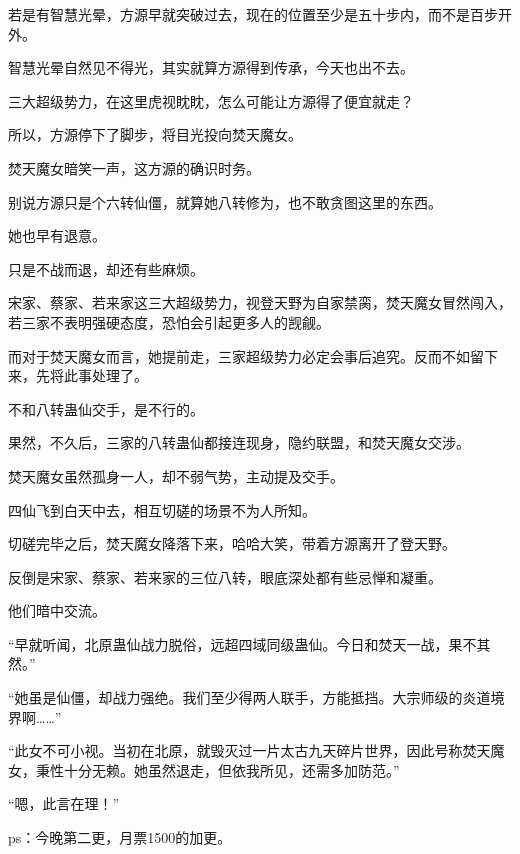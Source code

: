 \begin{this_body}
若是有智慧光晕，方源早就突破过去，现在的位置至少是五十步内，而不是百步开外。

智慧光晕自然见不得光，其实就算方源得到传承，今天也出不去。

三大超级势力，在这里虎视眈眈，怎么可能让方源得了便宜就走？

所以，方源停下了脚步，将目光投向焚天魔女。

焚天魔女暗笑一声，这方源的确识时务。

别说方源只是个六转仙僵，就算她八转修为，也不敢贪图这里的东西。

她也早有退意。

只是不战而退，却还有些麻烦。

宋家、蔡家、若来家这三大超级势力，视登天野为自家禁脔，焚天魔女冒然闯入，若三家不表明强硬态度，恐怕会引起更多人的觊觎。

而对于焚天魔女而言，她提前走，三家超级势力必定会事后追究。反而不如留下来，先将此事处理了。

不和八转蛊仙交手，是不行的。

果然，不久后，三家的八转蛊仙都接连现身，隐约联盟，和焚天魔女交涉。

焚天魔女虽然孤身一人，却不弱气势，主动提及交手。

四仙飞到白天中去，相互切磋的场景不为人所知。

切磋完毕之后，焚天魔女降落下来，哈哈大笑，带着方源离开了登天野。

反倒是宋家、蔡家、若来家的三位八转，眼底深处都有些忌惮和凝重。

他们暗中交流。

“早就听闻，北原蛊仙战力脱俗，远超四域同级蛊仙。今日和焚天一战，果不其然。”

“她虽是仙僵，却战力强绝。我们至少得两人联手，方能抵挡。大宗师级的炎道境界啊……”

“此女不可小视。当初在北原，就毁灭过一片太古九天碎片世界，因此号称焚天魔女，秉性十分无赖。她虽然退走，但依我所见，还需多加防范。”

“嗯，此言在理！”

ps：今晚第二更，月票1500的加更。

\end{this_body}

